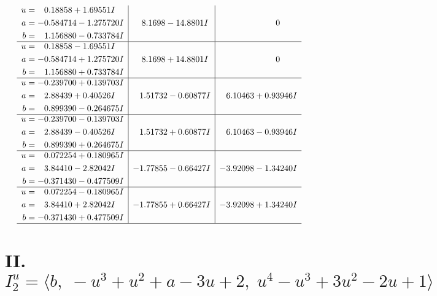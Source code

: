 \documentclass[1p]{elsarticle_modified}
\theoremstyle{definition}
\begin{document}
$$\begin{array}{c|c|c}
\begin{aligned}
u &= \phantom{-}0.18858 + 1.69551 I \\
a &= -0.584714 - 1.275720 I \\
b &= \phantom{-}1.156880 - 0.733784 I\end{aligned}
 & \phantom{-}8.1698 - 14.8801 I & \phantom{-0.000000 } 0 \\ \hline\begin{aligned}
u &= \phantom{-}0.18858 - 1.69551 I \\
a &= -0.584714 + 1.275720 I \\
b &= \phantom{-}1.156880 + 0.733784 I\end{aligned}
 & \phantom{-}8.1698 + 14.8801 I & \phantom{-0.000000 } 0 \\ \hline\begin{aligned}
u &= -0.239700 + 0.139703 I \\
a &= \phantom{-}2.88439 + 0.40526 I \\
b &= \phantom{-}0.899390 - 0.264675 I\end{aligned}
 & \phantom{-}1.51732 - 0.60877 I & \phantom{-}6.10463 + 0.93946 I \\ \hline\begin{aligned}
u &= -0.239700 - 0.139703 I \\
a &= \phantom{-}2.88439 - 0.40526 I \\
b &= \phantom{-}0.899390 + 0.264675 I\end{aligned}
 & \phantom{-}1.51732 + 0.60877 I & \phantom{-}6.10463 - 0.93946 I \\ \hline\begin{aligned}
u &= \phantom{-}0.072254 + 0.180965 I \\
a &= \phantom{-}3.84410 - 2.82042 I \\
b &= -0.371430 - 0.477509 I\end{aligned}
 & -1.77855 - 0.66427 I & -3.92098 - 1.34240 I \\ \hline\begin{aligned}
u &= \phantom{-}0.072254 - 0.180965 I \\
a &= \phantom{-}3.84410 + 2.82042 I \\
b &= -0.371430 + 0.477509 I\end{aligned}
 & -1.77855 + 0.66427 I & -3.92098 + 1.34240 I\\
 \hline 
 \end{array}$$\newpage\newpage\renewcommand{\arraystretch}{1}
\centering \section*{II. $I^u_{2}= \langle b,\;- u^3+u^2+a-3 u+2,\;u^4- u^3+3 u^2-2 u+1 \rangle$}
\end{document}
